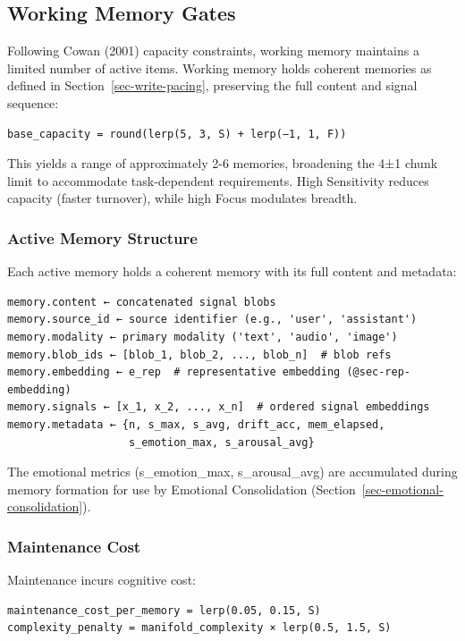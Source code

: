 \documentclass[
  letterpaper,
  DIV=11,
  numbers=noendperiod]{scrartcl}
\begin{document}
\subsection{Working Memory Gates}\label{working-memory-gates}

Following Cowan (2001) capacity constraints, working memory maintains a
limited number of active items. Working memory holds coherent memories
as defined in Section~\ref{sec-write-pacing}, preserving the full
content and signal sequence:

\begin{verbatim}
base_capacity = round(lerp(5, 3, S) + lerp(−1, 1, F))
\end{verbatim}

This yields a range of approximately 2-6 memories, broadening the 4±1
chunk limit to accommodate task-dependent requirements. High Sensitivity
reduces capacity (faster turnover), while high Focus modulates breadth.

\subsubsection{Active Memory Structure}\label{active-memory-structure}

Each active memory holds a coherent memory with its full content and
metadata:

\begin{verbatim}
memory.content ← concatenated signal blobs
memory.source_id ← source identifier (e.g., 'user', 'assistant')
memory.modality ← primary modality ('text', 'audio', 'image')
memory.blob_ids ← [blob_1, blob_2, ..., blob_n]  # blob refs
memory.embedding ← e_rep  # representative embedding (@sec-rep-embedding)
memory.signals ← [x_1, x_2, ..., x_n]  # ordered signal embeddings
memory.metadata ← {n, s_max, s_avg, drift_acc, mem_elapsed,
                   s_emotion_max, s_arousal_avg}
\end{verbatim}

The emotional metrics (s\_emotion\_max, s\_arousal\_avg) are accumulated
during memory formation for use by Emotional Consolidation
(Section~\ref{sec-emotional-consolidation}).

\subsubsection{Maintenance Cost}\label{maintenance-cost}

Maintenance incurs cognitive cost:

\begin{verbatim}
maintenance_cost_per_memory = lerp(0.05, 0.15, S)
complexity_penalty = manifold_complexity × lerp(0.5, 1.5, S)
\end{verbatim}
\end{document}
